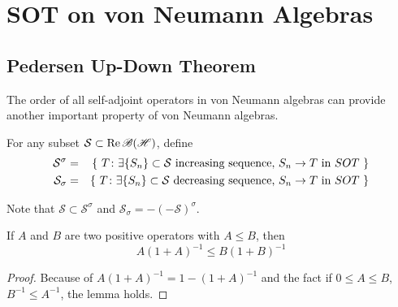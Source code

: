 \documentclass[a4paper,11pt]{report}
\begin{document}
\section{SOT on von Neumann Algebras}

\subsection{Pedersen Up-Down Theorem}

The order of all self-adjoint operators in von Neumann algebras can provide another important property of von Neumann algebras.

\begin{defn}
	For any subset $\mathcal{S} \subset \operatorname{Re}{\mathscr{B(H)}}$, define
	\begin{eqnarray*}
		\mathcal{S}^{\sigma} &=& \{~T \colon \exists \{S_n\} \subset \mathcal{S}  \text{  increasing sequence, } S_n \rightarrow T \text{ in } SOT~\} \\
		\mathcal{S}_{\sigma} &=& \{~T \colon \exists \{S_n\} \subset \mathcal{S}  \text{  decreasing sequence, } S_n \rightarrow T \text{ in } SOT~\}
	\end{eqnarray*}
\end{defn}
\begin{rem}
	Note that $\mathcal{S}  \subset \mathcal{S}^{\sigma}$ and $\mathcal{S}_{\sigma} = -(-\mathcal{S})^{\sigma}$.
\end{rem}

\begin{lem}
	If $A$ and $B$ are two positive operators with $A  \leqslant B$, then
	\begin{equation*}
		A(1+A)^{-1} \leqslant B(1+B)^{-1}
	\end{equation*}
\end{lem}
\begin{proof}
	Because of $A(1+A)^{-1} = 1  - (1+A)^{-1}$ and the fact if $0 \leqslant A \leqslant B$, $B^{-1} \leqslant A^{-1}$, the lemma holds.
\end{proof}
\end{document}

